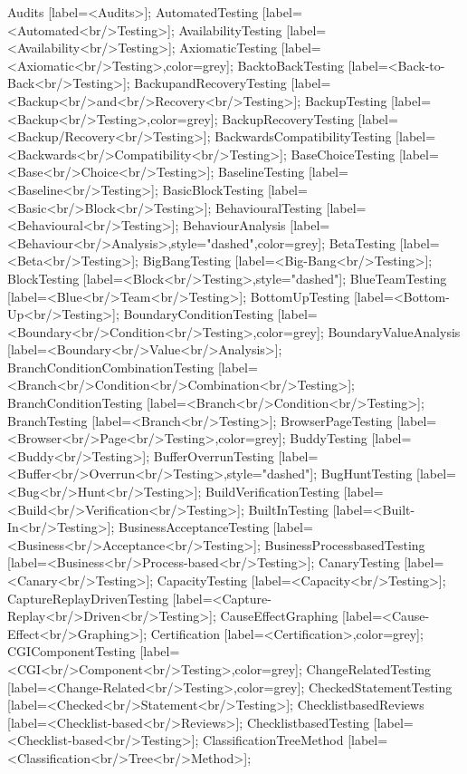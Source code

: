 \documentclass{article}
\begin{document}
{Audits [label=<Audits>];
AutomatedTesting [label=<Automated<br/>Testing>];
AvailabilityTesting [label=<Availability<br/>Testing>];
AxiomaticTesting [label=<Axiomatic<br/>Testing>,color=grey];
BacktoBackTesting [label=<Back-to-Back<br/>Testing>];
BackupandRecoveryTesting [label=<Backup<br/>and<br/>Recovery<br/>Testing>];
BackupTesting [label=<Backup<br/>Testing>,color=grey];
BackupRecoveryTesting [label=<Backup/Recovery<br/>Testing>];
BackwardsCompatibilityTesting [label=<Backwards<br/>Compatibility<br/>Testing>];
BaseChoiceTesting [label=<Base<br/>Choice<br/>Testing>];
BaselineTesting [label=<Baseline<br/>Testing>];
BasicBlockTesting [label=<Basic<br/>Block<br/>Testing>];
BehaviouralTesting [label=<Behavioural<br/>Testing>];
BehaviourAnalysis [label=<Behaviour<br/>Analysis>,style="dashed",color=grey];
BetaTesting [label=<Beta<br/>Testing>];
BigBangTesting [label=<Big-Bang<br/>Testing>];
BlockTesting [label=<Block<br/>Testing>,style="dashed"];
BlueTeamTesting [label=<Blue<br/>Team<br/>Testing>];
BottomUpTesting [label=<Bottom-Up<br/>Testing>];
BoundaryConditionTesting [label=<Boundary<br/>Condition<br/>Testing>,color=grey];
BoundaryValueAnalysis [label=<Boundary<br/>Value<br/>Analysis>];
BranchConditionCombinationTesting [label=<Branch<br/>Condition<br/>Combination<br/>Testing>];
BranchConditionTesting [label=<Branch<br/>Condition<br/>Testing>];
BranchTesting [label=<Branch<br/>Testing>];
BrowserPageTesting [label=<Browser<br/>Page<br/>Testing>,color=grey];
BuddyTesting [label=<Buddy<br/>Testing>];
BufferOverrunTesting [label=<Buffer<br/>Overrun<br/>Testing>,style="dashed"];
BugHuntTesting [label=<Bug<br/>Hunt<br/>Testing>];
BuildVerificationTesting [label=<Build<br/>Verification<br/>Testing>];
BuiltInTesting [label=<Built-In<br/>Testing>];
BusinessAcceptanceTesting [label=<Business<br/>Acceptance<br/>Testing>];
BusinessProcessbasedTesting [label=<Business<br/>Process-based<br/>Testing>];
CanaryTesting [label=<Canary<br/>Testing>];
CapacityTesting [label=<Capacity<br/>Testing>];
CaptureReplayDrivenTesting [label=<Capture-Replay<br/>Driven<br/>Testing>];
CauseEffectGraphing [label=<Cause-Effect<br/>Graphing>];
Certification [label=<Certification>,color=grey];
CGIComponentTesting [label=<CGI<br/>Component<br/>Testing>,color=grey];
ChangeRelatedTesting [label=<Change-Related<br/>Testing>,color=grey];
CheckedStatementTesting [label=<Checked<br/>Statement<br/>Testing>];
ChecklistbasedReviews [label=<Checklist-based<br/>Reviews>];
ChecklistbasedTesting [label=<Checklist-based<br/>Testing>];
ClassificationTreeMethod [label=<Classification<br/>Tree<br/>Method>];
}
\end{document}
